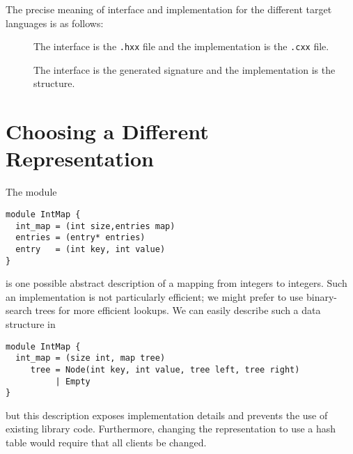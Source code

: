 The precise meaning of interface and implementation for the different
target languages is as follows:
\begin{description}
  \item[\Cplusplus{}]
    The interface is the \texttt{.hxx} file and the implementation is the \texttt{.cxx}
    file.
  \item[\sml{}]
    The interface is the generated signature and the implementation is the structure.
\end{description}%

\section{Choosing a Different Representation}

The \asdl{} module
\begin{code}\begin{lstlisting}[language=ASDL]
module IntMap {
  int_map = (int size,entries map)
  entries = (entry* entries)
  entry   = (int key, int value)
}
\end{lstlisting}\end{code}%
is one possible abstract description of a mapping from integers to
integers.
Such an implementation is not particularly efficient; we might prefer to
use binary-search trees for more efficient lookups.
We can easily describe such a data structure in \asdl{}
\begin{code}\begin{lstlisting}[language=ASDL]
module IntMap {
  int_map = (size int, map tree)
     tree = Node(int key, int value, tree left, tree right)
          | Empty
}
\end{lstlisting}\end{code}%
but this description exposes implementation details and prevents the use
of existing library code.  Furthermore, changing the representation
to use a hash table would require that all clients be changed.

